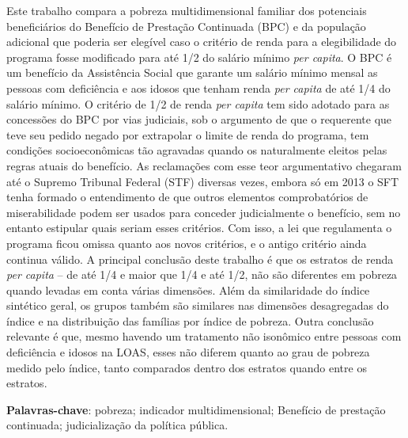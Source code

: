 \documentclass[
	12pt,				%
	openright,			%
	twoside,			%
	a4paper,			%
	english,			%
	french,				%
	spanish,			%
	brazil				%
	]{abntex2}
\begin{document}
\setlength{\absparsep}{18pt} %
\begin{resumo}
 Este trabalho compara a pobreza multidimensional familiar dos potenciais beneficiários do Benefício de Prestação Continuada (BPC) e da população adicional que poderia ser elegível caso o critério de renda para a elegibilidade do programa fosse modificado para até 1/2 do salário mínimo \textit{per capita}. O BPC é um benefício da Assistência Social que garante um salário mínimo mensal as pessoas com deficiência e aos idosos que tenham renda \textit{per capita} de até 1/4 do salário mínimo. O critério de 1/2 de renda \textit{per capita} tem sido adotado para as concessões do BPC por vias judiciais, sob o argumento de que o requerente que teve seu pedido negado por extrapolar o limite de renda do programa, tem condições socioeconômicas tão agravadas quando os naturalmente eleitos pelas regras atuais do benefício. As reclamações com esse teor argumentativo chegaram até o Supremo Tribunal Federal (STF) diversas vezes, embora só em 2013 o SFT tenha formado o entendimento de que outros elementos comprobatórios de miserabilidade podem ser usados para conceder judicialmente o benefício, sem no entanto estipular quais seriam esses critérios. Com isso, a lei que regulamenta o programa ficou omissa quanto aos novos critérios, e o antigo critério ainda continua válido. A principal conclusão deste trabalho é que os estratos de renda \textit{per capita} -- de até 1/4 e maior que 1/4 e até 1/2, não são diferentes em pobreza quando levadas em conta várias dimensões. Além da similaridade do índice sintético geral, os grupos também são similares nas dimensões desagregadas do índice e na distribuição das famílias por índice de pobreza. Outra conclusão relevante é que, mesmo havendo um tratamento não isonômico entre pessoas com deficiência e idosos na LOAS, esses não diferem quanto ao grau de pobreza medido pelo índice, tanto comparados dentro dos estratos quando entre os estratos.


 \textbf{Palavras-chave}: pobreza; indicador multidimensional; Benefício de prestação continuada; judicialização  da  política  pública.
\end{resumo}


\listoffigures*
\cleardoublepage

\listoftables*
\cleardoublepage
\end{document}
